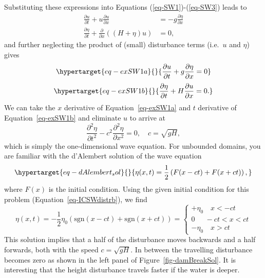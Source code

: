 \documentclass[
  letterpaper,
  twocolumn,
  landscape]{report}
\begin{document}
\begin{tcolorbox}
Substituting these expressions into Equations
(\ref{eq-SW1})-(\ref{eq-SW3}) leads to \begin{align*}
\frac{\partial u}{\partial t} + u \frac{\partial u}{\partial x} &= -g \frac{\partial \eta}{\partial x} \\
\frac{\partial \eta}{\partial t} + \frac{\partial}{\partial x} \left( (H + \eta)u \right) &=   0 ,
\end{align*} and further neglecting the product of (small) disturbance
terms (i.e.~\(u\) and \(\eta\)) gives
\begin{equation}\protect\hypertarget{eq-exSW1a}{}{
    \frac{\partial u}{\partial t}  + g \frac{\partial \eta}{\partial x} = 0 }\label{eq-exSW1a}\end{equation}
\begin{equation}\protect\hypertarget{eq-exSW1b}{}{ \frac{\partial \eta}{\partial t} + H \frac{\partial u}{\partial x}  =   0. }\label{eq-exSW1b}\end{equation}
We can take the \(x\) derivative of Equation~\ref{eq-exSW1a} and \(t\)
derivative of Equation~\ref{eq-exSW1b} and eliminate \(u\) to arrive at
\[
    \frac{\partial^2 \eta}{\partial t^2} - c^2 \frac{\partial^2 \eta}{\partial x^2} = 0 , \quad c = \sqrt{g H},
\] which is simply the one-dimensional wave equation. For unbounded
domains, you are familiar with the d'Alembert solution of the wave
equation \begin{equation}\protect\hypertarget{eq-dAlembert_sol}{}{
    \eta(x,t) = \frac{1}{2} \left( F(x-ct) + F(x+ct) \right),
}\label{eq-dAlembert_sol}\end{equation} where \(F(x)\) is the initial
condition. Using the given initial condition for this problem
(Equation~\ref{eq-ICSWdistrb}), we find \[
    \eta(x,t) = - \frac{1}{2} \eta_0 \left( \mathrm{sgn}(x-ct) + \mathrm{sgn}(x+ct) \right) = 
    \begin{cases}
+ \eta_0  \quad x<-ct  \\
       0 \ \   \quad -ct<x<ct \\
- \eta_0  \quad x>ct  
\end{cases}
\] This solution implies that a half of the disturbance moves backwards
and a half forwards, both with the speed \(c=\sqrt{g H}\). In between
the travelling disturbance becomes zero as shown in the left panel of
Figure~\ref{fig-damBreakSol}. It is interesting that the height
disturbance travels faster if the water is deeper.


\end{tcolorbox}
\end{document}
